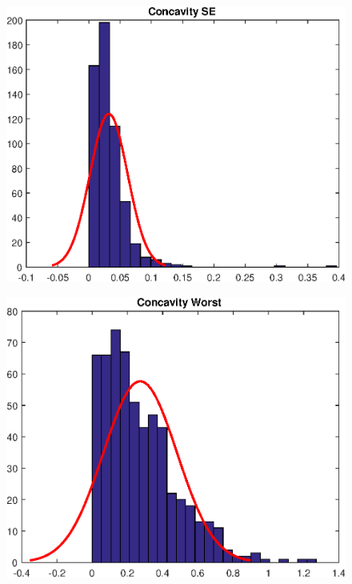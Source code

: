 \documentclass[11pt,a4paper]{article}
\numberwithin{equation}{section}
\begin{document}
\begin{itemize}
\begin{figure}[H]
\centering
\begin{minipage}{.5\textwidth}
  \centering
  \includegraphics[width=\linewidth]{./img/concavity_se}
  \label{fig:test1}
\end{minipage}%
\begin{minipage}{.5\textwidth}
  \centering
  \includegraphics[width=\linewidth]{./img/concavity_worst}
  \label{fig:test2}
\end{minipage}
\end{figure}


\end{itemize}
\end{document}
